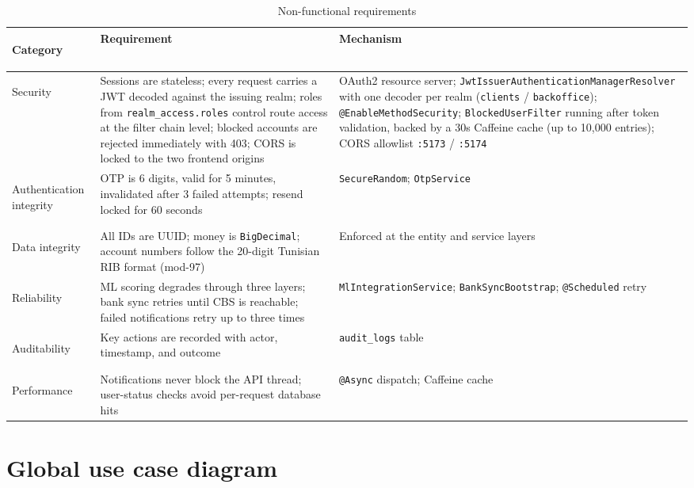 \documentclass[12pt,a4paper]{report}
\begin{document}
\begin{table}[H]
\centering
\renewcommand{\arraystretch}{1.25}
\begin{tabularx}{\linewidth}{|>{\bfseries\raggedright\arraybackslash}p{3.1cm}|>{\raggedright\arraybackslash}X|>{\raggedright\arraybackslash}X|}
\hline
\textbf{Category} & \textbf{Requirement} & \textbf{Mechanism} \\
\hline
Security & Sessions are stateless; every request carries a JWT decoded against the issuing realm; roles from \texttt{realm\_access.roles} control route access at the filter chain level; blocked accounts are rejected immediately with 403; CORS is locked to the two frontend origins & OAuth2 resource server; \texttt{JwtIssuerAuthentication\allowbreak ManagerResolver} with one decoder per realm (\texttt{clients} / \texttt{backoffice}); \texttt{@EnableMethodSecurity}; \texttt{BlockedUserFilter} running after token validation, backed by a 30s Caffeine cache (up to 10,000 entries); CORS allowlist \texttt{:5173} / \texttt{:5174} \\
\hline
Authentication integrity & OTP is 6 digits, valid for 5 minutes, invalidated after 3 failed attempts; resend locked for 60 seconds & \texttt{SecureRandom}; \texttt{OtpService} \\
\hline
Data integrity & All IDs are UUID; money is \texttt{BigDecimal}; account numbers follow the 20-digit Tunisian RIB format (mod-97) & Enforced at the entity and service layers \\
\hline
Reliability & ML scoring degrades through three layers; bank sync retries until CBS is reachable; failed notifications retry up to three times & \texttt{MlIntegrationService}; \texttt{BankSyncBootstrap}; \texttt{@Scheduled} retry \\
\hline
Auditability & Key actions are recorded with actor, timestamp, and outcome & \texttt{audit\_logs} table \\
\hline
Performance & Notifications never block the API thread; user-status checks avoid per-request database hits & \texttt{@Async} dispatch; Caffeine cache \\
\hline
\end{tabularx}
\caption{Non-functional requirements}
\label{tab:nfr}
\end{table}

\section{Global use case diagram}
\end{document}
